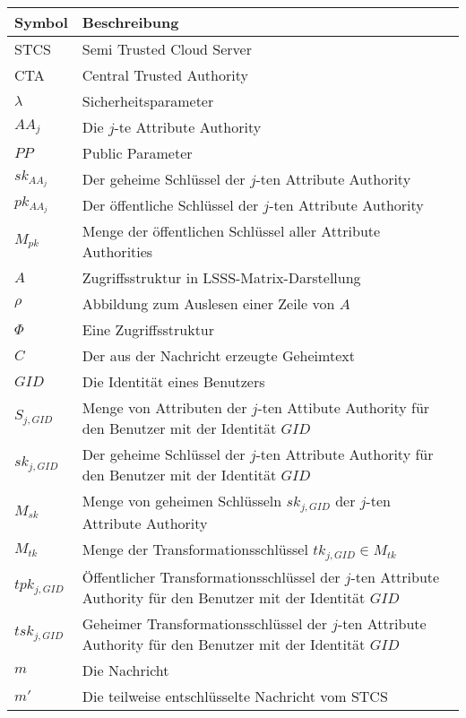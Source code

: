 \begin{center}
	\begin{small}
		\begin{tabular}{p{3cm}p{9cm}}
			\hline
			Symbol & Beschreibung \\
			\hline
			STCS & Semi Trusted Cloud Server \\
			CTA & Central Trusted Authority \\
			$\lambda$ & Sicherheitsparameter \\
			$AA_j$ & Die $j$-te Attribute Authority \\
			$PP$ & Public Parameter \\
			$sk_{AA_j}$ & Der geheime Schlüssel der $j$-ten Attribute Authority \\
			$pk_{AA_j}$ & Der öffentliche Schlüssel der $j$-ten Attribute Authority \\
			$M_{pk}$ & Menge der öffentlichen Schlüssel aller Attribute Authorities \\
			$A$ & Zugriffsstruktur in LSSS-Matrix-Darstellung \\
			$\rho$ & Abbildung zum Auslesen einer Zeile von $A$ \\
			$\Phi$ & Eine Zugriffsstruktur \\
			$C$ & Der aus der Nachricht erzeugte Geheimtext \\
			$GID$ & Die Identität eines Benutzers \\
			$S_{j, GID}$ & Menge von Attributen der $j$-ten Attibute Authority für den
			Benutzer mit der Identität $GID$ \\
			$sk_{j, GID}$ & Der geheime Schlüssel der $j$-ten Attribute Authority für
			den Benutzer mit der Identität $GID$ \\
			$M_{sk}$ & Menge von geheimen Schlüsseln $sk_{j, GID}$ der $j$-ten Attribute
			Authority \\
			$M_{tk}$ & Menge der Transformationsschlüssel $tk_{j, GID} \in M_{tk}$ \\
			$tpk_{j, GID}$ & Öffentlicher Transformationsschlüssel der $j$-ten
			Attribute Authority für den Benutzer mit der Identität $GID$ \\
			$tsk_{j, GID}$ & Geheimer Transformationsschlüssel der $j$-ten
			Attribute Authority für den Benutzer mit der Identität $GID$ \\
			$m$ & Die Nachricht \\
			$m'$ & Die teilweise entschlüsselte Nachricht vom STCS \\
			\hline
		\end{tabular}
	\end{small}
\end{center}
